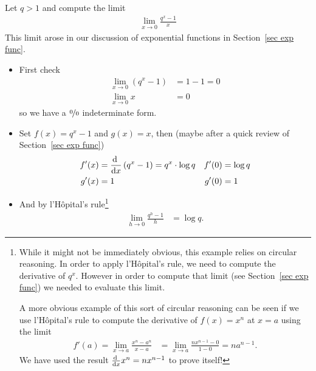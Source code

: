\begin{eg}
 Let $q>1$ and compute the limit
\begin{align*}
  \lim_{x \to0} \frac{q^x - 1}{x}
\end{align*}
This limit arose in our discussion of exponential functions in Section~\ref{sec exp func}.

\begin{itemize}
 \item First check
\begin{align*}
  \lim_{x \to 0} (q^x-1) & = 1-1 = 0 \\
  \lim_{x \to 0} x & = 0
\end{align*}
so we have a $\nicefrac00$ indeterminate form.
\item Set $f(x)= q^x-1$ and $g(x)=x$, then (maybe after a quick review of
Section~\ref{sec exp func})
\begin{align*}
  f'(x) &= \diff{}{x}\left(q^x-1\right) = q^x \cdot \log q
  & f'(0) &= \log q\\
  g'(x) &= 1 & g'(0) &= 1
\end{align*}
\item And by l'H\^opital's rule\footnote{While it might not be immediately obvious,
this example relies on circular reasoning. In order to apply l'H\^opital's rule, we need
to compute the derivative of $q^x$. However in order to compute that limit (see
Section~\ref{sec exp func}) we needed to evaluate this limit.

A more obvious example of this sort of circular reasoning can be seen if we use
l'H\^opital's rule to compute the derivative of $f(x)=x^n$ at $x=a$ using the limit
\begin{align*}
  f'(a) = \lim_{x \to a} \frac{x^n -a^n}{x-a} &= \lim_{x \to a} \frac{n x^{n-1}-0}{1-0} =
n a^{n-1}.
\end{align*}
We have used the result $\diff{}{x} x^n = nx^{n-1}$ to prove itself!
}
\begin{align*}
  \lim_{h \to0} \frac{q^h - 1}{h} &= \log q.
\end{align*}
\end{itemize}
\end{eg}



